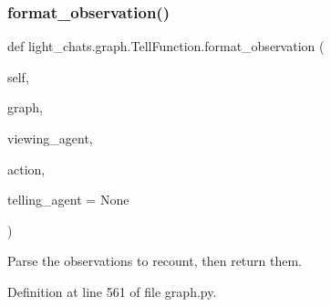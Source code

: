 \subsubsection{\texorpdfstring{format\+\_\+observation()}{format\_observation()}}
{\footnotesize\ttfamily def light\+\_\+chats.\+graph.\+Tell\+Function.\+format\+\_\+observation (\begin{DoxyParamCaption}\item[{}]{self,  }\item[{}]{graph,  }\item[{}]{viewing\+\_\+agent,  }\item[{}]{action,  }\item[{}]{telling\+\_\+agent = {\ttfamily None} }\end{DoxyParamCaption})}

\begin{DoxyVerb}Parse the observations to recount, then return them.
\end{DoxyVerb}
 

Definition at line 561 of file graph.\+py.


